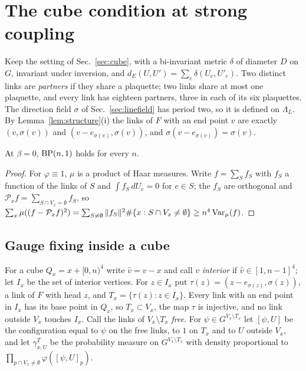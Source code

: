 \section{The cube condition at strong coupling}\label{sec:bpstrong}

Keep the setting of Sec.~\ref{sec:cube}, with a bi-invariant metric $\delta$
of diameter $D$ on $G$, invariant under inversion, and $d_E(U,U')=\sum_e
\delta(U_e,U'_e)$. Two distinct links are \emph{partners} if they share a
plaquette; two links share at most one plaquette, and every link has eighteen
partners, three in each of its six plaquettes. The direction field $\sigma$ of
Sec.~\ref{sec:linefield} has period two, so it is defined on $\Lambda_L$. By
Lemma~\ref{lem:structure}(i) the links of $F$ with an end point $v$ are exactly
$(v,\sigma(v))$ and $(v-e_{\sigma(v)},\sigma(v))$, and $\sigma(v-e_{\sigma(v)})=
\sigma(v)$.

\begin{proposition}\label{prop:bpsup}
At $\beta=0$, $\mathrm{BP}(n,1)$ holds for every $n$.
\end{proposition}

\begin{proof}
For $\varphi\equiv1$, $\mu$ is a product of Haar measures. Write $f=\sum_Sf_S$
with $f_S$ a function of the links of $S$ and $\int f_S\,dU_e=0$ for $e\in S$;
the $f_S$ are orthogonal and $\mathcal P_xf=\sum_{S\cap V_x=\emptyset}f_S$, so
$\sum_x\mu((f-\mathcal P_xf)^2)=\sum_{S\ne\emptyset}\|f_S\|^2\#\{x:S\cap V_x\ne
\emptyset\}\ge n^4\operatorname{Var}_\mu(f)$.
\end{proof}

\subsection*{Gauge fixing inside a cube}
For a cube $Q_x=x+[0,n)^4$ write $\hat v=v-x$ and call $v$ \emph{interior} if
$\hat v\in[1,n-1]^4$; let $I_x$ be the set of interior vertices. For $z\in I_x$
put $\tau(z)=(z-e_{\sigma(z)},\sigma(z))$, a link of $F$ with head $z$, and
$T_x=\{\tau(z):z\in I_x\}$. Every link with an end point in $I_x$ has its base
point in $Q_x$, so $T_x\subset V_x$, the map $\tau$ is injective, and no link
outside $V_x$ touches $I_x$. Call the links of $V_x\setminus T_x$ \emph{free}.
For $\psi\in G^{V_x\setminus T_x}$ let $[\psi,U]$ be the configuration equal to
$\psi$ on the free links, to $1$ on $T_x$ and to $U$ outside $V_x$, and let
$\gamma^T_{x,U}$ be the probability measure on $G^{V_x\setminus T_x}$ with
density proportional to $\prod_{p\cap V_x\ne\emptyset}\varphi([\psi,U]_p)$.

